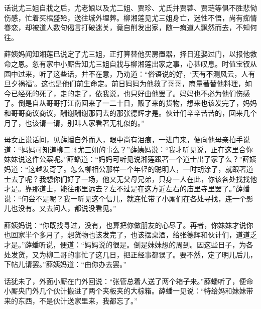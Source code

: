 
\begin{parag}
    话说尤三姐自戕之后，尤老娘以及尤二姐、贾珍、尤氏并贾蓉、贾琏等俱不胜悲恸伤感，忙着买棺盛殓，送往城外埋葬。柳湘莲见尤三姐身亡，迷性不悟，尚有痴情眷恋，却被道人数句偈言打破迷关，竟自削发出家，随一疯道人飘然而去，不知何往。
\end{parag}


\begin{parag}
    薛姨妈闻知湘莲已说定了尤三姐，正打算替他买房置器，择日迎娶过门，以报他救命之恩。忽有家中小厮吿知尤三姐自戕与柳湘莲出家之事，心甚叹息。时值宝钗从园中过来，听了这些话，并不在意，乃劝道：“俗语说的好，‘天有不测风云，人有旦夕祸福’。这也是他们前生命定。前日妈妈为他救了哥哥，商量著替他料理，如今已经死的死了，走的走了，依我说，也只好由他罢了。妈妈也不必为他们伤感了。倒是自从哥哥打江南回来了一二十日，贩了来的货物，想来也该发完了，妈妈和哥哥商议商议，酬谢酬谢那同去的那张德辉才是。伙计们辛辛苦苦的，回来几个月了，也该请一请，别叫人家看著无礼似的。”
\end{parag}


\begin{parag}
    母女正说话间，见薛蟠自外而入，眼中尚有泪痕，一进门来，便向他母亲拍手说道：“妈妈可知道柳二哥尤三姐的事么？”薛姨妈说：“我才听见说，正在这里合你妹妹说这件公案呢。”薛蟠道：“妈妈可听见说湘莲跟著一个道士出了家了么？”薛姨妈道：“这越发奇了。怎么柳相公那样一个年轻的聪明人，一时胡涂了，就跟著道士去了呢？我想你们好了一场，他又无父母兄弟，只身一人在此，你该各处找找他才是。靠那道士，能往那里远去？左不过是在这方近左右的庙里寺里罢了。”薛蟠说：“何尝不是呢？我一听见这个信儿，就连忙带了小厮们在各处寻找，连一个影儿也没有。又去问人，都说没看见。”
\end{parag}


\begin{parag}
    薛姨妈说：“你既找寻过，没有，也算把你做朋友的心尽了。再者，你妹妹才说你也回家半个多月了，想货物也该发完了，也该摆桌酒，给张德辉和伙计们，道道乏才是。”薛蟠听说，便道：“妈妈说的很是。倒是妹妹想的周到。因这些日子，为各处发货，又为柳二哥的事忙了这几日，把正经事都误了。要不然，定了明儿后儿，下帖儿请罢。”薛姨妈道：“由你办去罢。”
\end{parag}


\begin{parag}
    话犹未了，外面小厮在门外回说：“张管总着人送了两个箱子来。”薛蟠听了，便命小厮央门外几个伙计搬进了两个夹板夹的大棕箱。薛蟠一见说：“特给妈和妹妹带来的东西，不是伙计送家里来，我都忘了。”
\end{parag}


